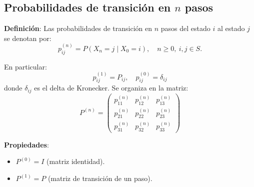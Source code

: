 \documentclass[12pt,a4paper]{article}
\newcommand{\definicion}[1]{%
\begin{definicionbox}
\textbf{Definición}: #1
\end{definicionbox}
}
\begin{document}
\begin{center}
\end{center}

\subsection*{Probabilidades de transición en $n$ pasos}

\definicion{Las probabilidades de transición en $n$ pasos del estado $i$ al estado $j$ se denotan por:
\begin{equation*}
p_{ij}^{(n)} = P(X_n = j \mid X_0 = i), \quad n \geq 0, \ i, j \in S.
\end{equation*}

En particular:
\begin{equation*}
p_{ij}^{(1)} = P_{ij}, \quad p_{ij}^{(0)} = \delta_{ij}
\end{equation*}
donde $\delta_{ij}$ es el delta de Kronecker. Se organiza en la matriz:
\begin{equation*}
P^{(n)} =
\begin{pmatrix}
p_{11}^{(n)} & p_{12}^{(n)} & p_{13}^{(n)} \\
p_{21}^{(n)} & p_{22}^{(n)} & p_{23}^{(n)} \\
p_{31}^{(n)} & p_{32}^{(n)} & p_{33}^{(n)}
\end{pmatrix}
\end{equation*}

}

\textbf{Propiedades}:
\begin{itemize}
    \item $P^{(0)} = I$ (matriz identidad).
    \item $P^{(1)} = P$ (matriz de transición de un paso).
\end{itemize}
\end{document}
